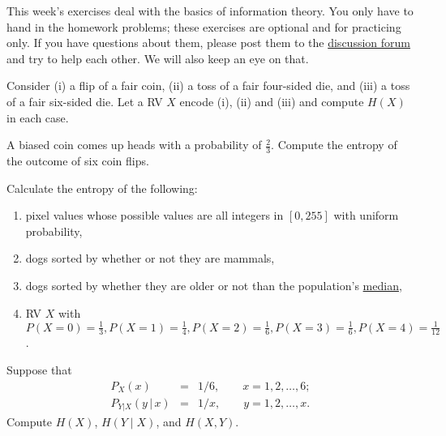 \documentclass[a4paper,10pt,landscape,twocolumn]{scrartcl}
\begin{document}
\practiceproblems

{\sffamily\noindent
This week's exercises deal with the basics of information theory. You only have to hand in the homework problems; these exercises are optional and for practicing only. 
If you have questions about them, please post them to the \href{\discussionForumURL}{discussion forum} and try to help each other. We will also keep an eye on that.
}

\begin{exercise}[entropies]
Consider (i) a flip of a fair coin, (ii) a toss of a fair four-sided die, and (iii) a toss of a fair six-sided die. Let a RV $X$ encode (i), (ii) and (iii) and compute $H(X)$ in each case.
\end{exercise}

\begin{exercise}
A biased coin comes up heads with a probability of $\frac{2}{3}$. Compute the entropy of the outcome of six coin flips.
\end{exercise}

\begin{exercise}
Calculate the entropy of the following:
\begin{enumerate}
\item pixel values whose possible values are all integers in $[0,255]$ with uniform probability, 
\item dogs sorted by whether or not they are mammals, 
\item dogs sorted by whether they are older or not than the population's \href{https://en.wikipedia.org/wiki/Median}{median}, 
\item RV $X$ with $P(X = 0) = \frac{1}{3}, P(X = 1) = \frac{1}{4}, P(X = 2) = \frac{1}{6}, P(X = 3) = \frac{1}{6}, P(X = 4) = \frac{1}{12}$.
\end{enumerate}
\end{exercise}

\begin{exercise}
Suppose that
\begin{eqnarray*}
P_{X}(x) & = & 1/6,\qquad x=1,2,\ldots,6;\\
P_{Y|X}(y\,|\, x) & = & 1/x,\qquad y=1,2,\ldots,x.
\end{eqnarray*}
Compute $H(X)$, $H(Y \mid X)$, and $H(X,Y)$.
\end{exercise}

\vfill
{}
\end{document}

